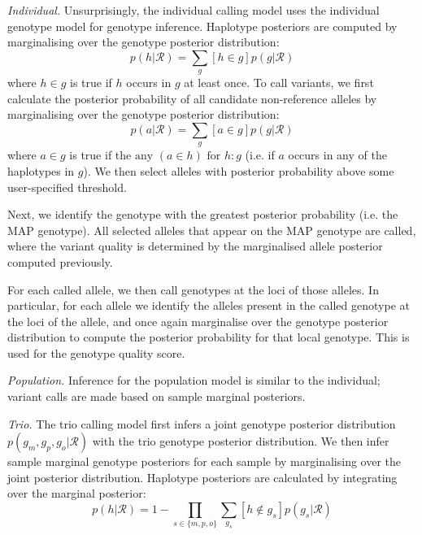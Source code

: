 \documentclass[notitlepage, twocolumn, 10pt]{article}
\begin{document}
\vspace{3mm}
\noindent\emph{Individual.} Unsurprisingly, the individual calling model uses the individual genotype model for genotype inference. Haplotype posteriors are computed by marginalising over the genotype posterior distribution:
\begin{equation*}
p(h | \mathcal{R}) = \sum_{g} [h \in g]p(g | \mathcal{R})
\end{equation*}
where $h \in g$ is true if $h$ occurs in $g$ at least once. To call variants, we first calculate the posterior probability of all candidate non-reference alleles by marginalising over the genotype posterior distribution:
\begin{equation*}
p(a | \mathcal{R}) = \sum_{g} [a \in g]p(g | \mathcal{R})
\end{equation*}
where $a \in g$ is true if the $\text{any }(a \in h) \text{ for } h : g$ (i.e. if $a$ occurs in any of the haplotypes in $g$). We then select alleles with posterior probability above some user-specified threshold.

Next, we identify the genotype with the greatest posterior probability (i.e. the MAP genotype). All selected alleles that appear on the MAP genotype are called, where the variant quality is determined by the marginalised allele posterior computed previously.

For each called allele, we then call genotypes at the loci of those alleles. In particular, for each allele we identify the alleles present in the called genotype at the loci of the allele, and once again marginalise over the genotype posterior distribution to compute the posterior probability for that local genotype. This is used for the genotype quality score.

\vspace{3mm}
\noindent\emph{Population.} Inference for the population model is similar to the individual; variant calls are made based on sample marginal posteriors.

\vspace{3mm}
\noindent\emph{Trio.} The trio calling model first infers a joint genotype posterior distribution $p(g_m, g_p, g_o | \boldsymbol{\mathcal{R}})$ with the trio genotype posterior distribution. We then infer sample marginal genotype posteriors for each sample by marginalising over the joint posterior distribution. Haplotype posteriors are calculated by integrating over the marginal posterior:
\begin{equation*}
p(h | \boldsymbol{\mathcal{R}}) = 1 - \prod_{s \in \{m, p, o\}}\sum_{g_s} [h \notin g_s]p(g_s | \boldsymbol{\mathcal{R}})
\end{equation*}
\end{document}
